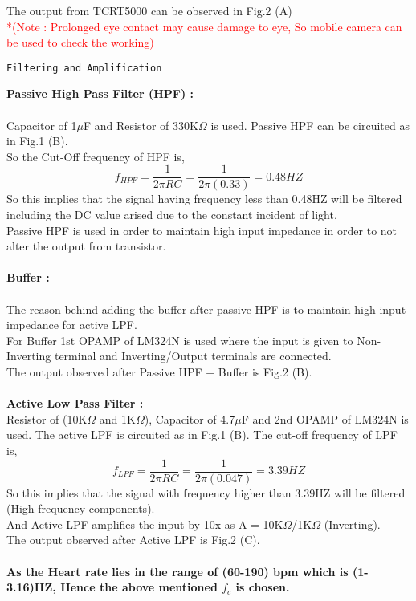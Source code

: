 \documentclass{homework}
\begin{document}
 The output from TCRT5000 can be observed in Fig.2 (A)\\
 \textcolor{red}{*(Note : Prolonged eye contact may cause damage to eye, So mobile camera can be used to check the working)}
\begin{center}
    \large{\texttt{Filtering and Amplification}}\\
\end{center}
\textbf{Passive High Pass Filter (HPF) :}\\
 \\
 Capacitor of 1$\mu$F  and Resistor of 330K$\Omega$ is used. Passive HPF can be circuited as in Fig.1 (B).\\
 So the Cut-Off frequency of HPF is,
 \[f_{HPF} = \frac{1}{2\pi RC} = \frac{1}{2\pi (0.33)} = 0.48HZ\]
 So this implies that the signal having frequency less than 0.48HZ will be filtered including the DC value arised due to the constant incident of light.\\
 Passive HPF is used in order to maintain high input impedance in order to not alter the output from transistor.\\
  \\
\textbf{Buffer :}\\
 \\
 The reason behind adding the buffer after passive HPF is to maintain high input impedance for active LPF.\\
 For Buffer 1st OPAMP of LM324N is used where the input is given to Non-Inverting terminal and Inverting/Output terminals are connected.\\
 The output observed after Passive HPF + Buffer is Fig.2 (B).\\
 \\
\textbf{Active Low Pass Filter :}\\
Resistor of (10K$\Omega$ and 1K$\Omega$), Capacitor of 4.7$\mu$F and 2nd OPAMP of LM324N is used. The active LPF is circuited as in Fig.1 (B). The cut-off frequency of LPF is,
\[f_{LPF} = \frac{1}{2\pi RC} = \frac{1}{2\pi (0.047)} = 3.39HZ\]
So this implies that the signal with frequency higher than 3.39HZ will be filtered (High frequency components).\\
And Active LPF amplifies the input by 10x as A = 10K$\Omega$/1K$\Omega$ (Inverting).\\
The output observed after Active LPF is Fig.2 (C).\\
 \\
\textbf{As the Heart rate lies in the range of (60-190) bpm which is (1-3.16)HZ, Hence the above mentioned $f_c$ is chosen.}\\
\end{document}
